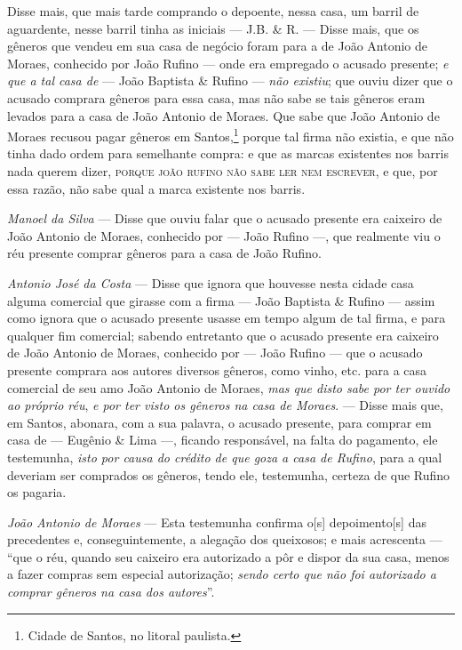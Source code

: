 Disse mais, que mais tarde comprando o depoente, nessa casa, um barril
de aguardente, nesse barril tinha as iniciais --- J.B. \& R. --- Disse
mais, que os gêneros que vendeu em sua casa de negócio foram para a de
João Antonio de Moraes, conhecido por João Rufino --- onde era
empregado o acusado presente; \emph{e que a tal casa de} --- João Baptista
\& Rufino --- \emph{não existiu}; que ouviu dizer que o acusado
comprara gêneros para essa casa, mas não sabe se tais gêneros eram
levados para a casa de João Antonio de Moraes. Que sabe que João Antonio
de Moraes recusou pagar gêneros em Santos,\footnote{Cidade de Santos,
  no litoral paulista.} porque tal firma não existia, e que não tinha
dado ordem para semelhante compra: e que as marcas existentes nos barris
nada querem dizer, \textsc{porque joão rufino não sabe ler nem escrever}, e que,
por essa razão, não sabe qual a marca existente nos barris.\medskip

\noindent\emph{Manoel da Silva} --- Disse que ouviu falar que o acusado presente
era caixeiro de João Antonio de Moraes, conhecido por --- João Rufino
---, que realmente viu o réu presente comprar gêneros para a casa de
João Rufino.\medskip

\noindent\emph{Antonio José da Costa} --- Disse que ignora que houvesse nesta
cidade casa alguma comercial que girasse com a firma --- João Baptista \&
Rufino --- assim como ignora que o acusado presente usasse em tempo algum
de tal firma, e para qualquer fim comercial; sabendo entretanto que o
acusado presente era caixeiro de João Antonio de Moraes, conhecido por ---
João Rufino --- que o acusado presente comprara aos autores diversos
gêneros, como vinho, etc. para a casa comercial de seu amo João Antonio
de Moraes, \emph{mas que disto sabe por ter ouvido ao próprio réu},
\emph{e por ter visto os gêneros na casa de Moraes}. --- Disse mais que,
em Santos, abonara, com a sua palavra, o acusado presente, para comprar
em casa de --- Eugênio \& Lima ---, ficando responsável, na falta do
pagamento, ele testemunha, \emph{isto por causa do crédito de que goza a
casa de Rufino}, para a qual deveriam ser comprados os gêneros, tendo
ele, testemunha, certeza de que Rufino os pagaria.\medskip

\noindent\emph{João Antonio de Moraes} --- Esta testemunha confirma o{[}s{]}
depoimento{[}s{]} das precedentes e, conseguintemente, a alegação dos
queixosos; e mais acrescenta --- ``que o réu, quando seu caixeiro era
autorizado a pôr e dispor da sua casa, menos a fazer compras sem
especial autorização; \emph{sendo certo que não foi autorizado a comprar
gêneros na casa dos autores}''.

